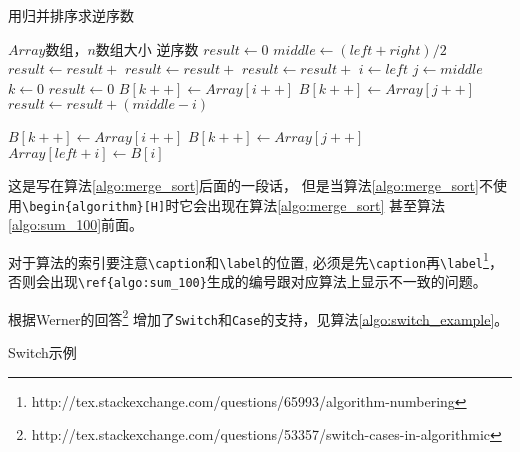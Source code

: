\begin{algorithm}
\caption{用归并排序求逆序数}
\label{algo:merge_sort}
\begin{algorithmic}[1] %
\Require $Array$数组，$n$数组大小 %
\Ensure 逆序数 %
  \State $result \gets 0$
    \State $middle \gets (left + right) / 2$
    \State $result \gets result +$ 
    \State $result \gets result +$ 
    \State $result \gets result +$ 
  \EndIf
  \State {}
\EndFunction
\State %
  \State $i\gets left$
  \State $j\gets middle$
  \State $k\gets 0$
  \State $result \gets 0$
      \State $B[k++]\gets Array[i++]$
    \Else
      \State $B[k++] \gets Array[j++]$
      \State $result \gets result + (middle - i)$
    \EndIf
  \EndWhile
\end{algorithmic}
\end{algorithm}

\begin{algorithm}
\begin{algorithmic}[1]
    \State $B[k++] \gets Array[i++]$
  \EndWhile
    \State $B[k++] \gets Array[j++]$
  \EndWhile
    \State $Array[left + i] \gets B[i]$
  \EndFor
  \State {}
\EndFunction
\end{algorithmic}
\end{algorithm}

这是写在算法\ref{algo:merge_sort}后面的一段话，
但是当算法\ref{algo:merge_sort}不使用\verb+\begin{algorithm}[H]+时它会出现在算法\ref{algo:merge_sort}
甚至算法\ref{algo:sum_100}前面。

对于算法的索引要注意\verb+\caption+和\verb+\label+的位置, 
必须是先\verb+\caption+再\verb+\label+\footnote{http://tex.stackexchange.com/questions/65993/algorithm-numbering}，
否则会出现\verb+\ref{algo:sum_100}+生成的编号跟对应算法上显示不一致的问题。

根据Werner的回答\footnote{http://tex.stackexchange.com/questions/53357/switch-cases-in-algorithmic}
增加了\verb+Switch+和\verb+Case+的支持，见算法\ref{algo:switch_example}。

\begin{algorithm}
\caption{Switch示例}
\label{algo:switch_example}
\begin{algorithmic}[1]
    \EndCase
    \EndCase
    \Default
    \EndDefault
  \EndSwitch
\end{algorithmic}
\end{algorithm}
